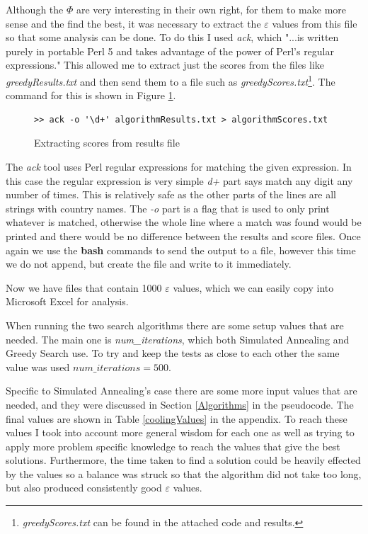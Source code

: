 \documentclass[12pt]{report}
\begin{document}
Although the $\Phi$ are very interesting in their own right, for them to make more sense and the find the best, it was necessary to extract the $\varepsilon$ values from this file so that some analysis can be done. To do this I used \textit{ack}\cite{ack}, which "...is written purely in portable Perl 5 and takes advantage of the power of Perl's regular expressions." This allowed me to extract just the scores from the files like \textit{greedyResults.txt} and then send them to a file such as \textit{greedyScores.txt}\footnote{\textit{greedyScores.txt} can be found in the attached code and results.}. The command for this is shown in Figure \ref{greedyScoreFile}.

\begin{figure}[H]
\caption{Extracting scores from results file}
\label{greedyScoreFile}
\begin{verbatim}
>> ack -o '\d+' algorithmResults.txt > algorithmScores.txt
\end{verbatim}
\end{figure}

The \textit{ack} tool uses Perl regular expressions for matching the given expression. In this case the regular expression is very simple \textit{d+} part says match any digit any number of times. This is relatively safe as the other parts of the lines are all strings with country names. The \textit{-o} part is a flag that is used to only print whatever is matched, otherwise the whole line where a match was found would be printed and there would be no difference between the results and score files. Once again we use the \textbf{bash} commands to send the output to a file, however this time we do not append, but create the file and write to it immediately.

Now we have files that contain 1000 $\varepsilon$ values, which we can easily copy into Microsoft Excel for analysis.

When running the two search algorithms there are some setup values that are needed. The main one is \textit{num\_iterations}, which both Simulated Annealing and Greedy Search use. To try and keep the tests as close to each other the same value was used $num\_iterations = 500$.

Specific to Simulated Annealing's case there are some more input values that are needed, and they were discussed in Section \ref{Algorithms} in the pseudocode. The final values are shown in Table \ref{coolingValues} in the appendix. To reach these values I took into account more general wisdom for each one as well as trying to apply more problem specific knowledge to reach the values that give the best solutions. Furthermore, the time taken to find a solution could be heavily effected by the values so a balance was struck so that the algorithm did not take too long, but also produced consistently good $\varepsilon$ values.
\end{document}
